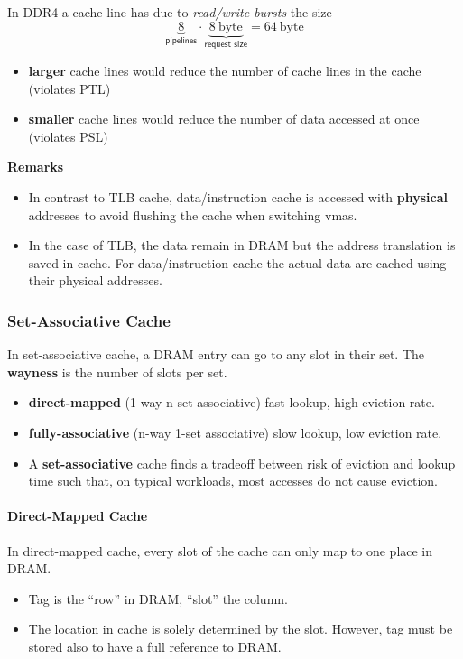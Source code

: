 In DDR4 a cache line has due to \textit{read/write bursts} the size
\noindent\begin{equation*}
    \underbrace{8}_{\textsf{pipelines}}\cdot \underbrace{8~\mathrm{byte}}_{\textsf{request size}} = 64 ~\mathrm{byte}
\end{equation*}

\begin{itemize}
    \item \textbf{larger} cache lines would reduce the number of cache lines in the cache (violates PTL)
    \item \textbf{smaller} cache lines would reduce the number of data accessed at once (violates PSL)
\end{itemize}

\newpar{}
\textbf{Remarks}
\begin{itemize}
    \item In contrast to TLB cache, data/instruction cache is accessed with \textbf{physical} addresses to avoid flushing the cache when switching vmas.
    \item In the case of TLB, the data remain in DRAM but the address translation is saved in cache. For data/instruction cache the actual data are cached using their physical addresses.
\end{itemize}

\subsubsection{Set-Associative Cache}
In set-associative cache, a DRAM entry can go to any slot in their set. The \textbf{wayness} is the number of slots per set.

\begin{itemize}
    \item \textbf{direct-mapped} (1-way n-set associative) fast lookup, high eviction rate. 
    \item \textbf{fully-associative} (n-way 1-set associative) slow lookup, low eviction rate.
    \item A \textbf{set-associative} cache finds a tradeoff between risk of eviction and lookup time such that, on typical workloads, most accesses do not cause eviction.
\end{itemize}

\paragraph{Direct-Mapped Cache}
In direct-mapped cache, every slot of the cache can only map to one place in DRAM.
\begin{itemize}
    \item Tag is the ``row'' in DRAM, ``slot'' the column.
    \item The location in cache is solely determined by the slot. However, tag must be stored also to have a full reference to DRAM.
\end{itemize}

